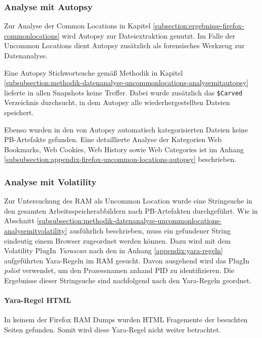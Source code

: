 \subsubsection*{Analyse mit Autopsy}
\label{subsubsection:ergebnisse-firefox-uncommonlocations-analysemitautopsy}
Zur Analyse der Common Locations in Kapitel \ref{subsection:ergebnisse-firefox-commonlocations} wird Autopsy zur Dateiextraktion genutzt. Im Falle der Uncommon Locations dient Autopsy zusätzlich als forensisches Werkzeug zur Datenanalyse.

Eine Autopsy Stichwortsuche gemäß Methodik in Kapitel \ref{subsubsection:methodik-datenanalyse-uncommonlocations-analysemitautopsy} lieferte in allen Snapshots keine Treffer. Dabei wurde zusätzlich das \texttt{\$Carved} Verzeichnis durchsucht, in dem Autopsy alle wiederhergestellten Dateien speichert.

Ebenso wurden in den von Autopsy automatisch kategorisierten Dateien keine PB-Artefakte gefunden. Eine detaillierte Analyse der Kategorien \grqq{}Web Bookmarks\grqq{}, \grqq{}Web Cookies\grqq{}, \grqq{}Web History\grqq{} sowie \grqq{}Web Categories\grqq{} ist im Anhang \ref{subsubsection:appendix-firefox-uncommon-locations-autopsy} beschrieben.

\subsubsection*{Analyse mit Volatility}
\label{subsubsection:ergebnisse-firefox-uncommonlocations-analysemitvolatility}
Zur Untersuchung des RAM als Uncommon Location wurde eine Stringsuche in den gesamten Arbeitsspeicherabbildern nach PB-Artefakten durchgeführt.
Wie in Abschnitt \ref{subsubsection:methodik-datenanalyse-uncommonlocations-analysemitvolatility} ausführlich beschrieben, muss ein gefundener String eindeutig einem Browser zugeordnet werden können. 
Dazu wird mit dem Volatility PlugIn \textit{Yarascan} nach den in Anhang \ref{appendix:yara-regeln} aufgeführten Yara-Regeln im RAM gesucht. Davon ausgehend wird das PlugIn \textit{pslist} verwendet, um den Prozessnamen anhand PID zu identifizieren.
Die Ergebnisse dieser Stringsuche sind nachfolgend nach den Yara-Regeln geordnet.

\paragraph*{Yara-Regel \grqq{}HTML\grqq{}}
In keinem der Firefox RAM Dumps wurden HTML Fragemente der besuchten Seiten gefunden. Somit wird diese Yara-Regel nicht weiter betrachtet.

